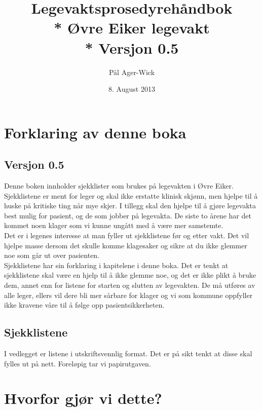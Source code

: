 \documentclass[12pt,a4paper]{memoir}
\author{Pål Ager-Wick }
\title {Legevaktsprosedyrehåndbok \\* Øvre Eiker legevakt \\* Versjon 0.5}
\date{8. August 2013}
\begin{document}
\renewcommand{\chaptername}{Del}

\renewcommand{\bibname}{Kilder:}
\renewcommand{\contentsname}{Innhold:}
\renewcommand{\listfigurename}{Oversikt over tableller og bilder:}


  

\tableofcontents


\chapter{Forklaring av denne boka}
	\section{Versjon 0.5} \label{versjon}
	Denne boken innholder sjekklister som brukes på legevakten i Øvre Eiker. Sjekklistene er ment for leger og skal ikke erstatte klinisk skjønn, men hjelpe til å huske på kritiske ting når mye skjer. I tillegg skal den hjelpe til å gjøre legevakta best mulig for pasient, og de som jobber på legevakta. De siste to årene har det kommet noen klager som vi kunne ungått med å være mer samstemte. \\
	Det er i legenes interesse at man fyller ut sjekklistene før og etter vakt. Det vil hjelpe masse dersom det skulle komme klagesaker og sikre at du ikke glemmer noe som går ut over pasienten\cite{manifesto}.\\
	Sjekklistene har sin forklaring i kapitelene i denne boka. Det er tenkt at sjekklistene skal være en hjelp til å ikke glemme noe, og det er ikke plikt å bruke dem, annet enn for listene for starten og slutten av legevakten. De må utføres av alle leger, ellers vil dere bli mer sårbare for klager og vi som kommune oppfyller ikke kravene våre til å følge opp pasientsikkerheten. 

	\section{Sjekklistene}
	I vedlegget er listene i utskriftsvennlig format. Det er på sikt tenkt at disse skal fylles ut på nett. Foreløpig tar vi papirutgaven. 

\chapter{Hvorfor gjør vi dette?}\label{chap:desc_lv_start}
\end{document}
